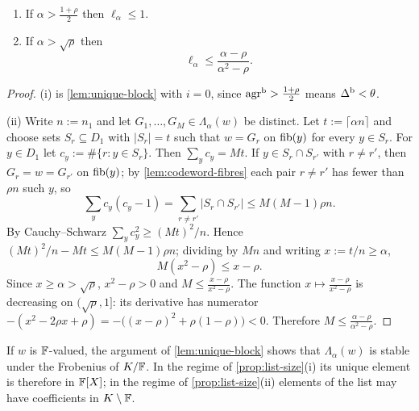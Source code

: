 \begin{proposition}\label{prop:list-size}
\begin{enumerate}[label=\textup{(\roman*)}]
\item If $\alpha>\frac{1+\rho}2$ then $\ell_\alpha\le1$.
\item If $\alpha>\sqrt\rho$ then
\[
\ell_\alpha\le\frac{\alpha-\rho}{\alpha^2-\rho}.
\]
\end{enumerate}
\end{proposition}

\begin{proof}
(i) is \cref{lem:unique-block} with $i=0$, since $\mathrm{agr}^{\mathrm{b}}>\frac{1+\rho}2$ means
$\Delta^{\mathrm{b}}<\theta$.

(ii) Write $n:=n_1$ and let $G_1,\dots,G_M\in\Lambda_\alpha(w)$ be distinct. Let
$t:=\lceil\alpha n\rceil$ and choose sets $S_r\subseteq D_1$ with $|S_r|=t$ such that
$w=G_r$ on $\mathrm{fib}(y)$ for every $y\in S_r$. For $y\in D_1$ let
$c_y:=\#\{r: y\in S_r\}$. Then $\sum_yc_y=Mt$. If $y\in S_r\cap S_{r'}$ with $r\ne r'$,
then $G_r=w=G_{r'}$ on $\mathrm{fib}(y)$; by \cref{lem:codeword-fibres} each pair $r\ne r'$ has
fewer than $\rho n$ such $y$, so
\[
\sum_yc_y(c_y-1)=\sum_{r\ne r'}|S_r\cap S_{r'}|\le M(M-1)\rho n .
\]
By Cauchy--Schwarz $\sum_yc_y^2\ge(Mt)^2/n$. Hence
$(Mt)^2/n-Mt\le M(M-1)\rho n$; dividing by $Mn$ and writing $x:=t/n\ge\alpha$,
\[
M(x^2-\rho)\le x-\rho .
\]
Since $x\ge\alpha>\sqrt\rho$, $x^2-\rho>0$ and $M\le\frac{x-\rho}{x^2-\rho}$. The function
$x\mapsto\frac{x-\rho}{x^2-\rho}$ is decreasing on $(\sqrt\rho,1]$: its derivative has
numerator $-(x^2-2\rho x+\rho)=-\bigl((x-\rho)^2+\rho(1-\rho)\bigr)<0$. Therefore
$M\le\frac{\alpha-\rho}{\alpha^2-\rho}$.
\end{proof}

\begin{remark}\label{rem:list-galois}
If $w$ is $\mathbb{F}$-valued, the argument of \cref{lem:unique-block} shows that
$\Lambda_\alpha(w)$ is stable under the Frobenius of $K/\mathbb{F}$. In the regime of
\cref{prop:list-size}(i) its unique element is therefore in $\mathbb{F}[X]$; in the regime of
\cref{prop:list-size}(ii) elements of the list may have coefficients in $K\setminus\mathbb{F}$.
\end{remark}
